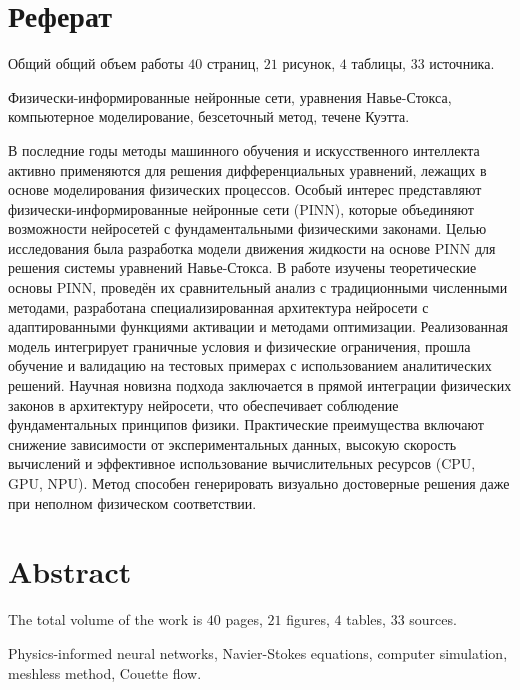 \chapter*{Реферат}
Общий общий объем работы $40$ страниц, $21$ рисунок, $4$ таблицы, $33$ источника.

Физически-информированные нейронные сети, уравнения Навье-Стокса,
компьютерное моделирование, безсеточный метод, течене Куэтта.

В последние годы методы машинного обучения и искусственного интеллекта активно применяются
для решения дифференциальных уравнений, лежащих в основе моделирования физических процессов.
Особый интерес представляют физически-информированные нейронные сети (PINN), которые
объединяют возможности нейросетей с фундаментальными физическими законами. Целью исследования
была разработка модели движения жидкости на основе PINN для решения системы уравнений Навье-Стокса.
В работе изучены теоретические основы PINN, проведён их
сравнительный анализ с традиционными численными методами, разработана специализированная
архитектура нейросети с адаптированными функциями активации и методами оптимизации.
Реализованная модель интегрирует граничные условия и физические ограничения, прошла обучение
и валидацию на тестовых примерах с использованием аналитических решений.
Научная новизна подхода заключается в прямой интеграции физических законов в архитектуру
нейросети, что обеспечивает соблюдение фундаментальных принципов физики. Практические
преимущества включают снижение зависимости от экспериментальных данных, высокую скорость
вычислений и эффективное использование вычислительных ресурсов (CPU, GPU, NPU). 
Метод способен генерировать визуально достоверные решения даже при неполном физическом соответствии.

\chapter*{Abstract}
The total volume of the work is $40$ pages, $21$ figures, $4$ tables, $33$ sources.

Physics-informed neural networks, Navier-Stokes equations, 
computer simulation, meshless method, Couette flow.

